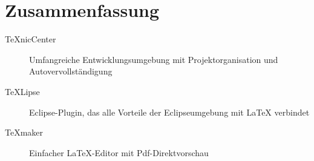 \chapter{Zusammenfassung}

\begin{description}
	\item [TeXnicCenter] Umfangreiche Entwicklungsumgebung mit Projektorganisation und Autovervollständigung
	\item [TeXLipse] Eclipse-Plugin, das alle Vorteile der Eclipseumgebung mit LaTeX verbindet
	\item [TeXmaker] Einfacher LaTeX-Editor mit Pdf-Direktvorschau
\end{description}
